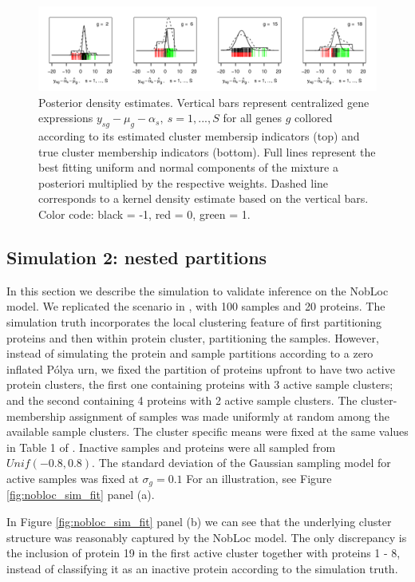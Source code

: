 \begin{figure}[H]
\centering
\includegraphics[scale=0.7]{./veera/density_estimates_sim_subset.pdf}
\caption{Posterior density estimates. Vertical bars represent centralized gene expressions $y_{sg} - \mu_g - \alpha_s, \ s = 1, ..., S$ for all genes $g$ collored according to its estimated cluster membersip indicators (top) and true cluster membership indicators (bottom). Full lines represent the best fitting uniform and normal components of the mixture a posteriori multiplied by the respective weights. Dashed line corresponds to a kernel density estimate based on the vertical bars. Color code: black = -1, red = 0, green = 1.}
\label{fig:poe_densities}
\end{figure} 


\subsection{Simulation 2: nested partitions}

In this section we describe the simulation to validate inference on the NobLoc model. We replicated the scenario in \cite{lee2013}, with 100 samples and 20 proteins. The simulation truth incorporates the local clustering feature of first partitioning proteins and then within protein cluster, partitioning the samples. However, instead of simulating the protein and sample partitions according to a zero inflated Pólya urn, we fixed the partition of proteins upfront to have two active protein clusters, the first one containing  proteins with 3 active sample clusters; and the second containing 4 proteins with 2 active sample clusters. The cluster-membership assignment of samples was made uniformly at random among the available sample clusters. The cluster specific means were fixed at the same values in Table 1 of \cite{lee2013}. Inactive samples and proteins were all sampled from $Unif(-0.8, 0.8)$. The standard deviation of the Gaussian sampling model for active samples was fixed at $\sigma_g = 0.1$ For an illustration, see Figure \ref{fig:nobloc_sim_fit} panel (a). 

In Figure \ref{fig:nobloc_sim_fit} panel (b) we can see that the underlying cluster structure was reasonably captured by the NobLoc model. The only discrepancy is the inclusion of protein 19 in the first active cluster together with proteins 1 - 8, instead of classifying it as an inactive protein according to the simulation truth.

